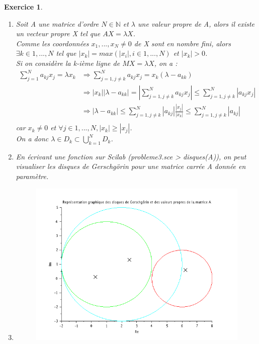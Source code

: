 \documentclass[a4paper,11pt]{article}
\newtheorem{exo}{Exercice}
\newcommand{\abs}[1]{\left\lvert#1\right\rvert}
\begin{document}
\begin{exo} \ \\
\begin{enumerate}
\item Soit A une matrice d'ordre $ N \in \mathbb{N} $ et $ \lambda $ une valeur propre de A, alors il existe un vecteur propre X tel que $ AX = \lambda X $. \ \\
Comme les coordonnées $ x_1,...,x_N \ne 0 $ de X sont en nombre fini, alors $ \exists k \in 1,...,N $ tel que $ \abs{x_k} = max(\abs{x_i}, i \in 1,...,N) $ et $ \abs{x_k} > 0 $. \ \\
Si on considère la k-ième ligne de $ MX = \lambda X $, on a : \ \\
\begin{equation}
\begin{aligned}
\sum_{j=1}^{N} a_{kj}x_j = \lambda x_k & \Rightarrow \sum_{j=1,j\ne k}^{N} a_{kj}x_j = x_k(\lambda - a_{kk}) \ \\
& \Rightarrow \abs{x_k}\abs{\lambda-a_{kk}} = \abs{\sum_{j=1,j\ne k}^{N} a_{kj}x_j} \le \sum_{j=1,j\ne k}^{N} \abs{a_{kj}x_j} \ \\
& \Rightarrow \abs{\lambda-a_{kk}} \le \sum_{j=1,j\ne k}^{N} \abs{a_{kj}}\frac{\abs{x_j}}{\abs{x_k}}
 \le \sum_{j=1,j\ne k}^{N} \abs{a_{kj}} \ \\
\end{aligned}
\end{equation}
car $ x_k \ne 0 $ et $ \forall j \in 1,...,N, \abs{x_k} \ge \abs{x_j} $. \ \\
On a donc $ \lambda \in D_k \subset \bigcup_{k=1}^ND_k $.
\item En écrivant une fonction sur Scilab (probleme3.sce > disques(A)), on peut visualiser les disques de Gerschgörin pour une matrice carrée A donnée en paramètre.
\item
\begin{figure}[h]
\includegraphics[scale=0.6]{../annexes/images/disques.PNG}

\end{figure}
\end{enumerate}
\end{exo}
\end{document}
